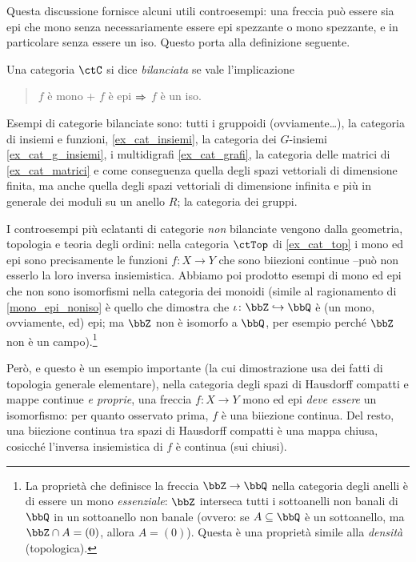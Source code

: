 Questa discussione fornisce alcuni utili controesempi:	una freccia può essere sia epi che mono senza necessariamente essere epi spezzante o mono spezzante,	e in particolare senza essere un iso. Questo porta alla definizione seguente.
\begin{definition}\label{def_cat_bilanciata}
 Una categoria \(\ctC\) si dice \emph{bilanciata} se vale l'implicazione
 \begin{quote}
  \(f\) è mono + \(f\) è epi \(\To\) \(f\) è un iso.
 \end{quote}
\end{definition}
\begin{remark}\label{exa_balans}
 Esempi di categorie bilanciate sono: tutti i gruppoidi (ovviamente\dots), la categoria di insiemi e funzioni, \ref{ex_cat_insiemi}, la categoria dei \(G\)-insiemi \ref{ex_cat_g_insiemi}, i multidigrafi \ref{ex_cat_grafi}, la categoria delle matrici di \ref{ex_cat_matrici} e come conseguenza quella degli spazi vettoriali di dimensione finita, ma anche quella degli spazi vettoriali di dimensione infinita e più in generale dei moduli su un anello \(R\); la categoria dei gruppi.

 I controesempi più eclatanti di categorie \emph{non} bilanciate vengono dalla geometria, topologia e teoria degli ordini: nella categoria \(\ctTop\) di \ref{ex_cat_top} i mono ed epi sono precisamente le funzioni \(f \colon X\to Y\) che sono biiezioni continue --può non esserlo la loro inversa insiemistica. Abbiamo poi prodotto esempi di mono ed epi che non sono isomorfismi nella categoria dei monoidi (simile al ragionamento di \ref{mono_epi_noniso} è quello che dimostra che \(\iota \colon \bbZ\mono\bbQ\) è (un mono, ovviamente, ed) epi; ma \(\bbZ\) non è isomorfo a \(\bbQ\), per esempio perché \(\bbZ\) non è un campo).\footnote{La proprietà che definisce la freccia \(\bbZ\to\bbQ\) nella categoria degli anelli è di essere un mono \emph{essenziale}: \(\bbZ\) interseca tutti i sottoanelli non banali di \(\bbQ\) in un sottoanello non banale (ovvero: se \(A\subseteq\bbQ\) è un sottoanello, ma \(\bbZ\cap A=(0)\), allora \(A=(0)\)). Questa è una proprietà simile alla \emph{densità} (topologica).}

 Però, e questo è un esempio importante (la cui dimostrazione usa dei fatti di topologia generale elementare), nella categoria degli spazi di Hausdorff compatti e mappe continue \emph{e proprie}, una freccia \(f \colon X\to Y\) mono ed epi \emph{deve essere} un isomorfismo: per quanto osservato prima, \(f\) è una biiezione continua. Del resto, una biiezione continua tra spazi di Hausdorff compatti è una mappa chiusa, cosicché l'inversa insiemistica di \(f\) è continua (sui chiusi).
\end{remark}

